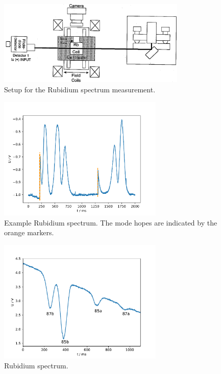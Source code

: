 \begin{figure}
  \centering
  \includegraphics[width=0.8\textwidth]{Pics/setup_spectrum.png}
  \caption{Setup for the Rubidium spectrum measurement.\cite{anleitung}}
  \label{fig:setup_spectrum}
\end{figure}

\begin{figure}
  \centering
  \includegraphics[width=0.7\textwidth]{Pics/example_spectrum_hop.pdf}
  \caption{Example Rubidium spectrum. The mode hopes are indicated by the orange markers.}
  \label{fig:example}
\end{figure}

\FloatBarrier
\begin{figure}
  \centering
  \includegraphics[width=0.7\textwidth]{Pics/Rb_spectrum.pdf}
  \caption{Rubidium spectrum.}
  \label{fig:spectrum}
\end{figure}
\FloatBarrier

